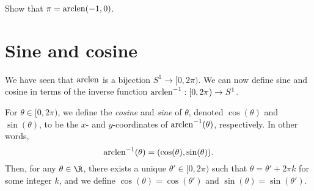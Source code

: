 \begin{exercise}
	Show that $\pi = \mathrm{arclen}(-1,0)$. 
\end{exercise}

\section{Sine and cosine}

We have seen that $\mathrm{arclen}$ is a bijection $S^1 \to [0, 2\pi)$. We can now define sine and cosine in terms of the inverse function $\mathrm{arclen}^{-1} : [0, 2\pi) \to S^1$.  

\begin{definition}
	For $\theta \in [0, 2\pi)$, we define the \emph{cosine} and \emph{sine} of $\theta$, denoted $\cos(\theta)$ and $\sin(\theta)$, to be the $x$- and $y$-coordinates of $\mathrm{arclen}^{-1}(\theta)$, respectively. In other words,
	\[ \mathrm{arclen}^{-1}(\theta) = (\cos(\theta), \sin(\theta)). \]
	Then, for any $\theta \in \R$, there exists a unique $\theta' \in [0, 2\pi)$ such that $\theta = \theta' + 2\pi k$ for some integer $k$, and we define $\cos(\theta) = \cos(\theta')$ and $\sin(\theta) = \sin(\theta')$. 
\end{definition}




